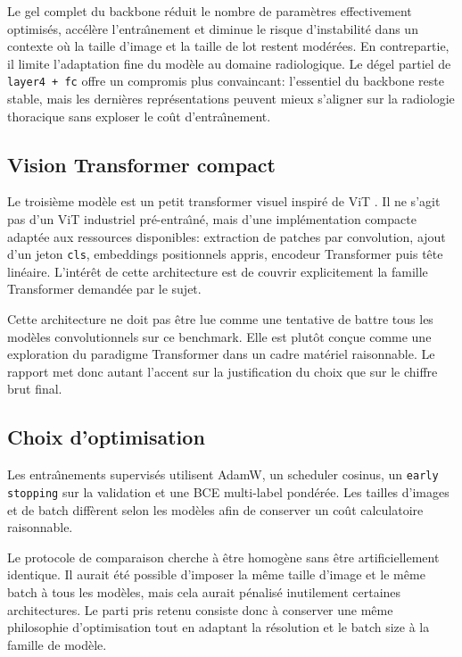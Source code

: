 \documentclass[11pt,a4paper]{article}
\begin{document}
Le gel complet du backbone r\'eduit le nombre de param\`etres effectivement optimis\'es, acc\'el\`ere l'entra\^\i nement et diminue le risque d'instabilit\'e dans un contexte o\`u la taille d'image et la taille de lot restent mod\'er\'ees. En contrepartie, il limite l'adaptation fine du mod\`ele au domaine radiologique. Le d\'egel partiel de \texttt{layer4 + fc} offre un compromis plus convaincant: l'essentiel du backbone reste stable, mais les derni\`eres repr\'esentations peuvent mieux s'aligner sur la radiologie thoracique sans exploser le co\^ut d'entra\^\i nement.

\subsection{Vision Transformer compact}
Le troisi\`eme mod\`ele est un petit transformer visuel inspir\'e de ViT \cite{dosovitskiy2021vit}. Il ne s'agit pas d'un ViT industriel pr\'e-entra\^\i n\'e, mais d'une impl\'ementation compacte adapt\'ee aux ressources disponibles: extraction de patches par convolution, ajout d'un jeton \texttt{cls}, embeddings positionnels appris, encodeur Transformer puis t\^ete lin\'eaire. L'int\'er\^et de cette architecture est de couvrir explicitement la famille Transformer demand\'ee par le sujet.

Cette architecture ne doit pas \^etre lue comme une tentative de battre tous les mod\`eles convolutionnels sur ce benchmark. Elle est plut\^ot con\c{c}ue comme une exploration du paradigme Transformer dans un cadre mat\'eriel raisonnable. Le rapport met donc autant l'accent sur la justification du choix que sur le chiffre brut final.

\subsection{Choix d'optimisation}
Les entra\^\i nements supervis\'es utilisent AdamW, un scheduler cosinus, un \texttt{early stopping} sur la validation et une BCE multi-label pond\'er\'ee. Les tailles d'images et de batch diff\`erent selon les mod\`eles afin de conserver un co\^ut calculatoire raisonnable.

Le protocole de comparaison cherche \`a \^etre homog\`ene sans \^etre artificiellement identique. Il aurait \'et\'e possible d'imposer la m\^eme taille d'image et le m\^eme batch \`a tous les mod\`eles, mais cela aurait p\'enalis\'e inutilement certaines architectures. Le parti pris retenu consiste donc \`a conserver une m\^eme philosophie d'optimisation tout en adaptant la r\'esolution et le batch size \`a la famille de mod\`ele.
\end{document}
